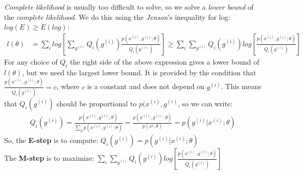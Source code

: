 \documentclass[]{article}
\begin{document}
\emph{Complete likelihood} is usually too difficult to solve, so we solve a \emph{lower bound} of the \emph{complete likelihood}. We do this using the \emph{Jenson}'s inequality for log: $log(E)\geq E(log)$:\\
$$
\begin{aligned}
	{l}(\theta) &=  \sum_i  log\left[\sum_{g^{(i)}}Q_i(g^{(i)}) \frac{p(x^{(i)},g^{(i)};\theta)}{Q_i(g^{(i)})}\right] \geq \sum_i \sum_{g^{(i)}}Q_i(g^{(i)}) log\left[ \frac{p(x^{(i)},g^{(i)};\theta)}{Q_i(g^{(i)})}\right]
\end{aligned}
$$
For any choice of $Q_i$ the right side of the above expression gives a lower bound of ${l}(\theta)$, but we need the largest lower bound. It is provided by the condition that $\frac{p(x^{(i)},g^{(i)};\theta)}{Q_i(g^{(i)})} = c$, where $c$ is a constant and does not depend on $g^{(i)}$. This means that $Q_i(g^{(i)})$ should be proportional to $p(x^{(i)},g^{(i)}$, so we can write:
$$
\begin{aligned}
	Q_i(g^{(i)}) = \frac{p(x^{(i)},g^{(i)};\theta)}{\sum_g p(x^{(i)},g^{(i)};\theta)} = \frac{p(x^{(i)},g^{(i)};\theta)}{p(x^{i};\theta)} = p(g^{(i)}|x^{(i)};\theta)
\end{aligned}
$$
So, the \textbf{E-step} is to compute: $Q_i(g^{(i)})  = p(g^{(i)}|x^{(i)};\theta)$\\
The \textbf{M-step} is to maximize: $\sum_i \sum_{g^{(i)}}Q_i(g^{(i)}) log\left[ \frac{p(x^{(i)},g^{(i)};\theta)}{Q_i(g^{(i)})}\right]$
\end{document}
